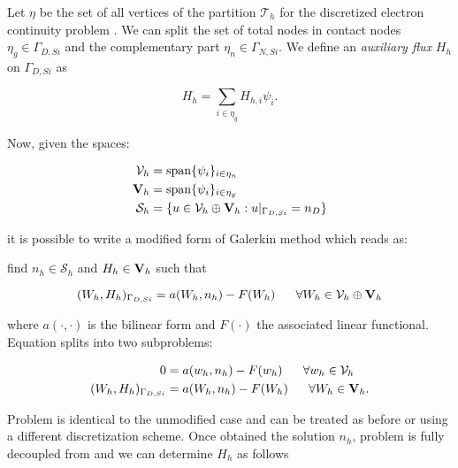 Let $\eta$ be the set of all vertices of the partition $\mathcal{T}_h$ for the discretized electron continuity problem . We can split the set of total nodes in contact nodes $\eta_g \in \Gamma_{D,Si}$ and the complementary part $\eta_n \in \Gamma_{N,Si}$. We define an \textit{auxiliary flux} $H_h$ on $\Gamma_{D,Si}$ as

\begin{equation}
H_h = \sum_{i\in\eta_g} H_{h,i} \psi_i .
\end{equation}


Now, given the spaces:

\begin{align*}
\mathcal{V}_h & =  {\rm span}\{\psi_i\}_{i \in \eta_n} \\
\mathbf{V}_h & =  {\rm span}\{\psi_i\}_{i \in \eta_g}  \\
\mathcal{S}_h & =  \{u \in \mathcal{V}_h \oplus \mathbf{V}_h: u|_{\Gamma_{D,Si}} = n_D \}
\end{align*}

it is possible to write a modified form of Galerkin method which reads as:

find $n_h  \in \mathcal{S}_h$ and $H_h \in \mathbf{V}_h$ such that

\begin{equation}
\label{eq: modified galerkin}
(W_h,H_h)_{\Gamma_{D,Si}} = a(W_h,n_h)-F(W_h) \psp{10} \forall W_h \in \mathcal{V}_h \oplus \vect{V}_h
\end{equation}

where $a(\cdot,\cdot)$ is the bilinear form  and $F(\cdot)$ the associated linear functional.
Equation  splits into two subproblems:

\begin{align}
0  & = a(w_h,n_h)-F(w_h) \psp{10} \forall w_h \in \mathcal{V}_h \label{eq: usual problem}\\
(W_h,H_h)_{\Gamma_{D,Si}} & = a(W_h,n_h)-F(W_h) \psp{10} \forall W_h \in \vect{V}_h . \label{eq: flux problem}
\end{align}

Problem  is identical to the unmodified case and can be treated as before or using a different discretization scheme. Once obtained the solution $n_h$, problem  is fully decoupled from  and we can determine $H_h$ as follows


